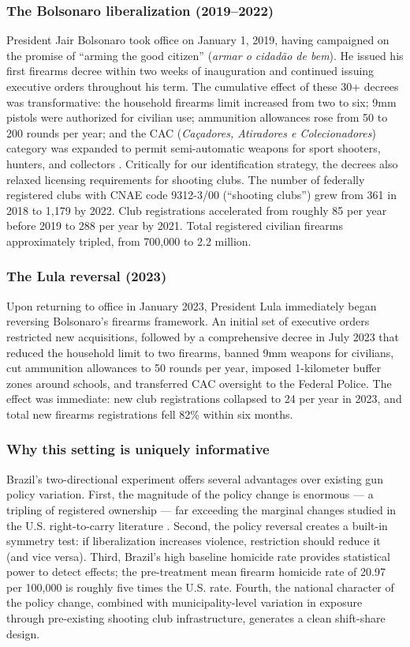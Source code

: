 \documentclass[12pt]{article}
\begin{document}
\subsubsection*{The Bolsonaro liberalization (2019--2022)} President Jair Bolsonaro took office on January 1, 2019, having campaigned on the promise of ``arming the good citizen'' (\textit{armar o cidad\~{a}o de bem}). He issued his first firearms decree within two weeks of inauguration and continued issuing executive orders throughout his term. The cumulative effect of these 30+ decrees was transformative: the household firearms limit increased from two to six; 9mm pistols were authorized for civilian use; ammunition allowances rose from 50 to 200 rounds per year; and the CAC (\textit{Ca\c{c}adores, Atiradores e Colecionadores}) category was expanded to permit semi-automatic weapons for sport shooters, hunters, and collectors \citep{fbsp2022armas}. Critically for our identification strategy, the decrees also relaxed licensing requirements for shooting clubs. The number of federally registered clubs with CNAE code 9312-3/00 (``shooting clubs'') grew from 361 in 2018 to 1,179 by 2022. Club registrations accelerated from roughly 85 per year before 2019 to 288 per year by 2021. Total registered civilian firearms approximately tripled, from 700,000 to 2.2 million.

\subsubsection*{The Lula reversal (2023)} Upon returning to office in January 2023, President Lula immediately began reversing Bolsonaro's firearms framework. An initial set of executive orders restricted new acquisitions, followed by a comprehensive decree in July 2023 that reduced the household limit to two firearms, banned 9mm weapons for civilians, cut ammunition allowances to 50 rounds per year, imposed 1-kilometer buffer zones around schools, and transferred CAC oversight to the Federal Police. The effect was immediate: new club registrations collapsed to 24 per year in 2023, and total new firearms registrations fell 82\% within six months.

\subsubsection*{Why this setting is uniquely informative} Brazil's two-directional experiment offers several advantages over existing gun policy variation. First, the magnitude of the policy change is enormous --- a tripling of registered ownership --- far exceeding the marginal changes studied in the U.S. right-to-carry literature \citep{donohue2019rtc, donohue2022whyrtc}. Second, the policy reversal creates a built-in symmetry test: if liberalization increases violence, restriction should reduce it (and vice versa). Third, Brazil's high baseline homicide rate provides statistical power to detect effects; the pre-treatment mean firearm homicide rate of 20.97 per 100,000 is roughly five times the U.S. rate. Fourth, the national character of the policy change, combined with municipality-level variation in exposure through pre-existing shooting club infrastructure, generates a clean shift-share design.
\end{document}
